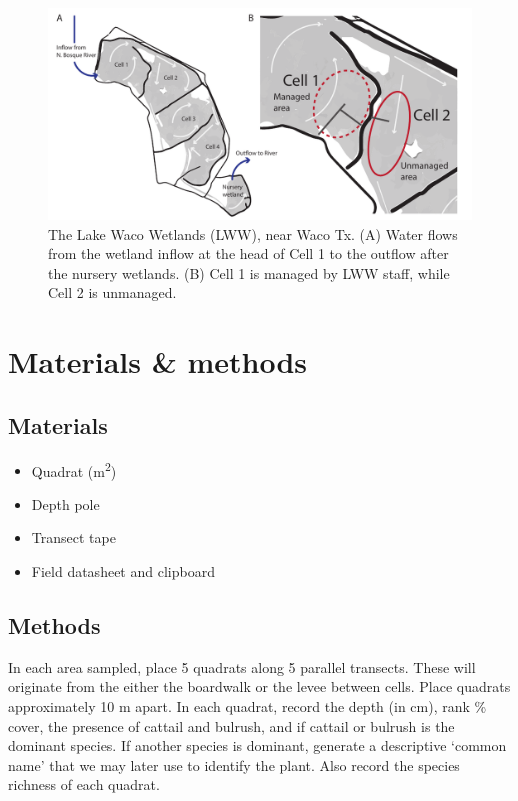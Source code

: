 \documentclass[11pt,]{article}
\begin{document}
\begin{figure}
\centering
\includegraphics{../_chapter_materials/lww_figure.pdf}
\caption{The Lake Waco Wetlands (LWW), near Waco Tx. (A) Water flows
from the wetland inflow at the head of Cell 1 to the outflow after the
nursery wetlands. (B) Cell 1 is managed by LWW staff, while Cell 2 is
unmanaged.}
\end{figure}

\hypertarget{materials-methods}{%
\section{Materials \& methods}\label{materials-methods}}

\hypertarget{materials}{%
\subsection{Materials}\label{materials}}

\begin{multicols}{2}
\begin{itemize}{}
  \item Quadrat (m\textsuperscript{2})
  \item Depth pole
  \item Transect tape
  \item Field datasheet and clipboard
\end{itemize}
\end{multicols}

\hypertarget{methods}{%
\subsection{Methods}\label{methods}}

In each area sampled, place 5 quadrats along 5 parallel transects. These
will originate from the either the boardwalk or the levee between cells.
Place quadrats approximately 10 m apart. In each quadrat, record the
depth (in cm), rank \% cover, the presence of cattail and bulrush, and
if cattail or bulrush is the dominant species. If another species is
dominant, generate a descriptive `common name' that we may later use to
identify the plant. Also record the species richness of each quadrat.
\end{document}
